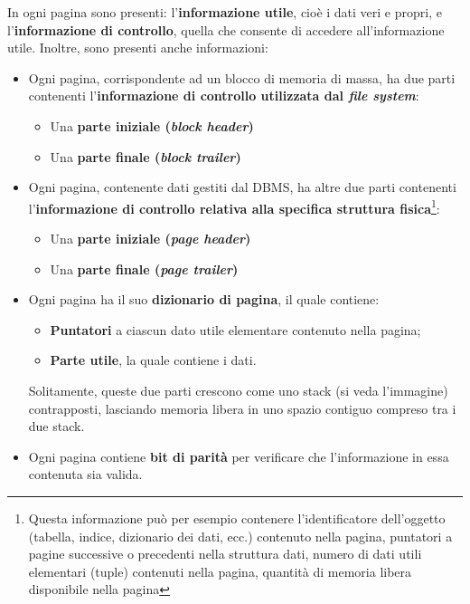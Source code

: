 \documentclass[a4paper]{article}
\begin{document}
	\noindent
	In ogni pagina sono presenti: l'\textbf{informazione utile}, cioè i dati veri e propri, e l'\textbf{informazione di controllo}, quella che consente di accedere all'informazione utile. Inoltre, sono presenti anche informazioni:
	\begin{itemize}
		\item Ogni pagina, corrispondente ad un blocco di memoria di massa, ha due parti contenenti l'\textbf{informazione di controllo utilizzata dal \emph{file system}}:
		\begin{itemize}
			\item Una \textbf{parte iniziale (\emph{block header})}
			\item Una \textbf{parte finale (\emph{block trailer})} 
		\end{itemize}
		
		\item Ogni pagina, contenente dati gestiti dal DBMS, ha altre due parti contenenti l'\textbf{informazione di controllo relativa alla specifica struttura fisica}\footnote{Questa informazione può per esempio contenere l'identificatore dell'oggetto (tabella, indice, dizionario dei dati, ecc.) contenuto nella pagina, puntatori a pagine successive o precedenti nella struttura dati, numero di dati utili elementari (tuple) contenuti nella pagina, quantità di memoria libera disponibile nella pagina}:
		\begin{itemize}
			\item Una \textbf{parte iniziale (\emph{page header})}
			\item Una \textbf{parte finale (\emph{page trailer})}
		\end{itemize}
		
		\item Ogni pagina ha il suo \textbf{dizionario di pagina}, il quale contiene:
		\begin{itemize}
			\item \textbf{Puntatori} a ciascun dato utile elementare contenuto nella pagina;
			\item \textbf{Parte utile}, la quale contiene i dati.
		\end{itemize}
		Solitamente, queste due parti crescono come uno stack (si veda l'immagine) contrapposti, lasciando memoria libera in uno spazio contiguo compreso tra i due stack.

		\item Ogni pagina contiene \textbf{bit di parità} per verificare che l'informazione in essa contenuta sia valida.
	\end{itemize}\newpage
\end{document}
